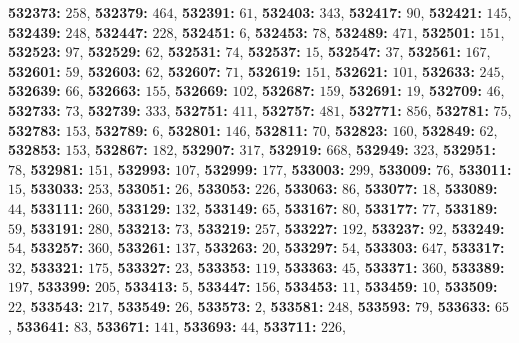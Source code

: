 \textsf{\bfseries 532373:} $258$, \textsf{\bfseries 532379:} $464$, \textsf{\bfseries 532391:} $61$, \textsf{\bfseries 532403:} $343$, \textsf{\bfseries 532417:} $90$, \textsf{\bfseries 532421:} $145$, \textsf{\bfseries 532439:} $248$, \textsf{\bfseries 532447:} $228$, \textsf{\bfseries 532451:} $6$, \textsf{\bfseries 532453:} $78$, \textsf{\bfseries 532489:} $471$, \textsf{\bfseries 532501:} $151$, \textsf{\bfseries 532523:} $97$, \textsf{\bfseries 532529:} $62$, \textsf{\bfseries 532531:} $74$, \textsf{\bfseries 532537:} $15$, \textsf{\bfseries 532547:} $37$, \textsf{\bfseries 532561:} $167$, \textsf{\bfseries 532601:} $59$, \textsf{\bfseries 532603:} $62$, \textsf{\bfseries 532607:} $71$, \textsf{\bfseries 532619:} $151$, \textsf{\bfseries 532621:} $101$, \textsf{\bfseries 532633:} $245$, \textsf{\bfseries 532639:} $66$, \textsf{\bfseries 532663:} $155$, \textsf{\bfseries 532669:} $102$, \textsf{\bfseries 532687:} $159$, \textsf{\bfseries 532691:} $19$, \textsf{\bfseries 532709:} $46$, \textsf{\bfseries 532733:} $73$, \textsf{\bfseries 532739:} $333$, \textsf{\bfseries 532751:} $411$, \textsf{\bfseries 532757:} $481$, \textsf{\bfseries 532771:} $856$, \textsf{\bfseries 532781:} $75$, \textsf{\bfseries 532783:} $153$, \textsf{\bfseries 532789:} $6$, \textsf{\bfseries 532801:} $146$, \textsf{\bfseries 532811:} $70$, \textsf{\bfseries 532823:} $160$, \textsf{\bfseries 532849:} $62$, \textsf{\bfseries 532853:} $153$, \textsf{\bfseries 532867:} $182$, \textsf{\bfseries 532907:} $317$, \textsf{\bfseries 532919:} $668$, \textsf{\bfseries 532949:} $323$, \textsf{\bfseries 532951:} $78$, \textsf{\bfseries 532981:} $151$, \textsf{\bfseries 532993:} $107$, \textsf{\bfseries 532999:} $177$, \textsf{\bfseries 533003:} $299$, \textsf{\bfseries 533009:} $76$, \textsf{\bfseries 533011:} $15$, \textsf{\bfseries 533033:} $253$, \textsf{\bfseries 533051:} $26$, \textsf{\bfseries 533053:} $226$, \textsf{\bfseries 533063:} $86$, \textsf{\bfseries 533077:} $18$, \textsf{\bfseries 533089:} $44$, \textsf{\bfseries 533111:} $260$, \textsf{\bfseries 533129:} $132$, \textsf{\bfseries 533149:} $65$, \textsf{\bfseries 533167:} $80$, \textsf{\bfseries 533177:} $77$, \textsf{\bfseries 533189:} $59$, \textsf{\bfseries 533191:} $280$, \textsf{\bfseries 533213:} $73$, \textsf{\bfseries 533219:} $257$, \textsf{\bfseries 533227:} $192$, \textsf{\bfseries 533237:} $92$, \textsf{\bfseries 533249:} $54$, \textsf{\bfseries 533257:} $360$, \textsf{\bfseries 533261:} $137$, \textsf{\bfseries 533263:} $20$, \textsf{\bfseries 533297:} $54$, \textsf{\bfseries 533303:} $647$, \textsf{\bfseries 533317:} $32$, \textsf{\bfseries 533321:} $175$, \textsf{\bfseries 533327:} $23$, \textsf{\bfseries 533353:} $119$, \textsf{\bfseries 533363:} $45$, \textsf{\bfseries 533371:} $360$, \textsf{\bfseries 533389:} $197$, \textsf{\bfseries 533399:} $205$, \textsf{\bfseries 533413:} $5$, \textsf{\bfseries 533447:} $156$, \textsf{\bfseries 533453:} $11$, \textsf{\bfseries 533459:} $10$, \textsf{\bfseries 533509:} $22$, \textsf{\bfseries 533543:} $217$, \textsf{\bfseries 533549:} $26$, \textsf{\bfseries 533573:} $2$, \textsf{\bfseries 533581:} $248$, \textsf{\bfseries 533593:} $79$, \textsf{\bfseries 533633:} $65$, \textsf{\bfseries 533641:} $83$, \textsf{\bfseries 533671:} $141$, \textsf{\bfseries 533693:} $44$, \textsf{\bfseries 533711:} $226$, 
